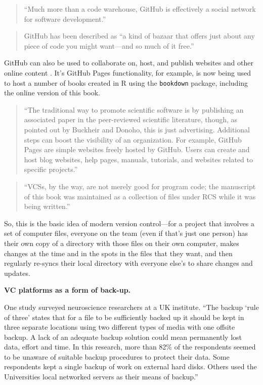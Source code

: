 \documentclass[]{tufte-book}
\begin{document}
\begin{quote}
``Much more than a code warehouse, GitHub is effectively a social network for
software development.'' \citep{perkel2018git}
\end{quote}

\begin{quote}
GitHub has been described as ``a kind of bazaar that offers just about any
piece of code you might want---and so much of it free.'' \citep{metz2015github}
\end{quote}

GitHub can also be used to collaborate on, host, and publish websites and other
online content \citep{perez2016ten}. It's GitHub Pages functionality, for example, is
now being used to host a number of books created in R using the \texttt{bookdown}
package, including the online version of this book.

\begin{quote}
``The traditional way to promote scientific software is by publishing an associated
paper in the peer-reviewed scientific literature, though, as pointed out by Buckheir and
Donoho, this is just advertising. Additional steps can boost the visibility of
an organization. For example, GitHub Pages are simple websites freely hosted by
GitHub. Users can create and host blog websites, help pages, manuals, tutorials,
and websites related to specific projects.'' \citep{perez2016ten}
\end{quote}

\begin{quote}
``VCSs, by the way, are not merely good for program code; the manuscript of this
book was maintained as a collection of files under RCS while it was being written.''
\citep{raymond2003art}
\end{quote}

So, this is the basic idea of modern version control---for a project that
involves a set of computer files, everyone on the team (even if that's just one
person) has their own copy of a directory with those files on their own
computer, makes changes at the time and in the spots in the files that they
want, and then regularly re-syncs their local directory with everyone else's to
share changes and updates.

\textbf{VC platforms as a form of back-up.}

One study surveyed neuroscience researchers at a UK institute. ``The backup `rule
of three' states that for a file to be sufficiently backed up it should be kept
in three separate locations using two different types of media with one offsite
backup. A lack of an adequate backup solution could mean permanently lost data,
effort and time. In this research, more than 82\% of the respondents seemed to be
unaware of suitable backup procedures to protect their data. Some respondents
kept a single backup of work on external hard disks. Others used the
Universities local networked servers as their means of backup.''
\citep{altarawneh2017pilot}
\end{document}

